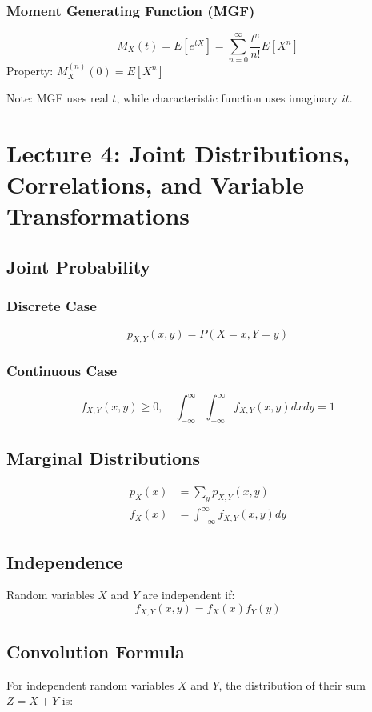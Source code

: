 \documentclass[10pt, twocolumn]{article}
\begin{document}
\subsubsection{Moment Generating Function (MGF)}
\[ M_X(t) = E[e^{tX}] = \sum_{n=0}^{\infty} \frac{t^n}{n!} E[X^n] \]
Property: $M_X^{(n)}(0) = E[X^n]$

Note: MGF uses real $t$, while characteristic function uses imaginary $it$.

\section{Lecture 4: Joint Distributions, Correlations, and Variable Transformations}

\subsection{Joint Probability}
\subsubsection{Discrete Case}
\[ p_{X,Y}(x,y) = P(X = x, Y = y) \]

\subsubsection{Continuous Case}
\[ f_{X,Y}(x,y) \geq 0, \quad \int_{-\infty}^{\infty} \int_{-\infty}^{\infty} f_{X,Y}(x,y) dx dy = 1 \]

\subsection{Marginal Distributions}
\begin{align}
    p_X(x) & = \sum_y p_{X,Y}(x,y)                     \\
    f_X(x) & = \int_{-\infty}^{\infty} f_{X,Y}(x,y) dy
\end{align}

\subsection{Independence}
Random variables $X$ and $Y$ are independent if:
\[ f_{X,Y}(x,y) = f_X(x) f_Y(y) \]

\subsection{Convolution Formula}
For independent random variables $X$ and $Y$, the distribution of their sum $Z = X + Y$ is:
\end{document}
